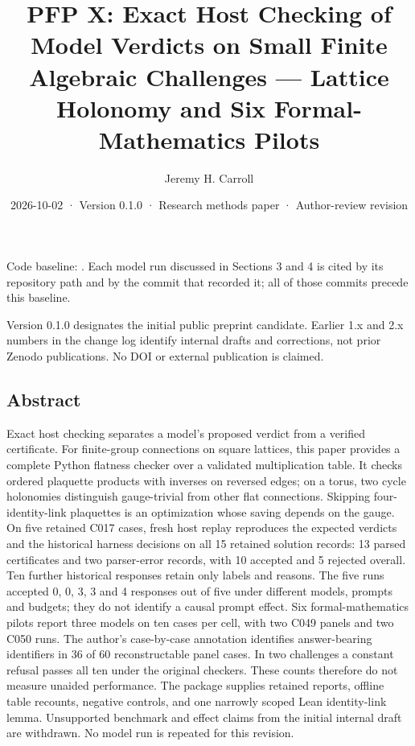 \documentclass[
  11pt,
]{article}
\title{PFP X: Exact Host Checking of Model Verdicts on Small Finite Algebraic Challenges — Lattice Holonomy and Six Formal-Mathematics Pilots}
\author{Jeremy H. Carroll}
\date{2026-10-02 · Version 0.1.0 · Research methods paper · Author-review revision}
\begin{document}
\makeatletter
\begin{center}
{\LARGE \@title\par}
\vspace{0.8em}
{\normalsize \@author\par}
\vspace{0.5em}
{\small \@date\par}
\end{center}
\makeatother
Code baseline:
\texttt{}. Each model
run discussed in Sections 3 and 4 is cited by its repository path and by
the commit that recorded it; all of those commits precede this baseline.

Version 0.1.0 designates the initial public preprint candidate. Earlier
1.x and 2.x numbers in the change log identify internal drafts and
corrections, not prior Zenodo publications. No DOI or external
publication is claimed.

\hypertarget{abstract}{%
\subsection{Abstract}\label{abstract}}

Exact host checking separates a model's proposed verdict from a verified
certificate. For finite-group connections on square lattices, this paper
provides a complete Python flatness checker over a validated
multiplication table. It checks ordered plaquette products with inverses
on reversed edges; on a torus, two cycle holonomies distinguish
gauge-trivial from other flat connections. Skipping four-identity-link
plaquettes is an optimization whose saving depends on the gauge. On five
retained C017 cases, fresh host replay reproduces the expected verdicts
and the historical harness decisions on all 15 retained solution
records: 13 parsed certificates and two parser-error records, with 10
accepted and 5 rejected overall. Ten further historical responses retain
only labels and reasons. The five runs accepted 0, 0, 3, 3 and 4
responses out of five under different models, prompts and budgets; they
do not identify a causal prompt effect. Six formal-mathematics pilots
report three models on ten cases per cell, with two C049 panels and two
C050 runs. The author's case-by-case annotation identifies
answer-bearing identifiers in 36 of 60 reconstructable panel cases. In
two challenges a constant refusal passes all ten under the original
checkers. These counts therefore do not measure unaided performance. The
package supplies retained reports, offline table recounts, negative
controls, and one narrowly scoped Lean identity-link lemma. Unsupported
benchmark and effect claims from the initial internal draft are
withdrawn. No model run is repeated for this revision.
\end{document}
